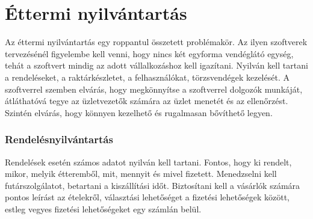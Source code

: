 \chapter{Éttermi nyilvántartás}










Az éttermi nyilvántartás egy roppantul összetett problémakör. Az ilyen szoftverek tervezésénél figyelembe kell venni, hogy nincs két egyforma vendéglátó egység, tehát a szoftvert mindig az adott vállalkozáshoz kell igazítani. Nyilván kell tartani a rendeléseket, a raktárkészletet, a felhasználókat, törzsvendégek kezelését. A szoftverrel szemben elvárás, hogy megkönnyítse a szoftverrel dolgozók munkáját, átláthatóvá tegye az üzletvezetők számára az üzlet menetét és az ellenőrzést. Szintén elvárás, hogy könnyen kezelhető és rugalmasan bővíthető legyen.

\subsection{Rendelésnyilvántartás}

Rendelések esetén számos adatot nyilván kell tartani. Fontos, hogy ki rendelt, mikor, melyik étteremből, mit, mennyit és mivel fizetett. Menedzselni kell futárszolgálatot, betartani a kiszállítási időt. Biztosítani kell a vásárlók számára pontos leírást az ételekről, választási lehetőséget a fizetési lehetőségek között, estleg vegyes fizetési lehetőségeket egy számlán belül.

